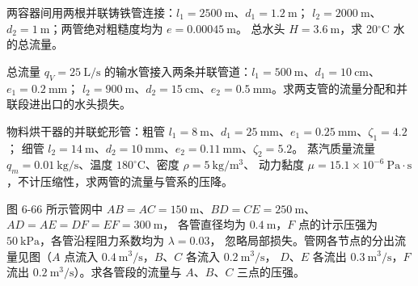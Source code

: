 \begin{ti}
\item[\textbf{6-27}] 两容器间用两根并联铸铁管连接：$l_1=2500\ \mathrm{m}$、$d_1=1.2\ \mathrm{m}$；
$l_2=2000\ \mathrm{m}$、$d_2=1\ \mathrm{m}$；两管绝对粗糙度均为 $e=0.00045\ \mathrm{m}$。
总水头 $H=3.6\ \mathrm{m}$，求 20$^\circ$C 水的总流量。
\quad{}\quad{}

\item[\textbf{6-28}] 总流量 $q_V=25\ \mathrm{L/s}$ 的输水管接入两条并联管道：$l_1=500\ \mathrm{m}$、$d_1=10\ \mathrm{cm}$、$e_1=0.2\ \mathrm{mm}$；
$l_2=900\ \mathrm{m}$、$d_2=15\ \mathrm{cm}$、$e_2=0.5\ \mathrm{mm}$。求两支管的流量分配和并联段进出口的水头损失。
\quad{}\quad{}

\item[\textbf{6-29}] 物料烘干器的并联蛇形管：粗管 $l_1=8\ \mathrm{m}$、$d_1=25\ \mathrm{mm}$、$e_1=0.25\ \mathrm{mm}$、$\zeta_1=4.2$；
细管 $l_2=14\ \mathrm{m}$、$d_2=10\ \mathrm{mm}$、$e_2=0.11\ \mathrm{mm}$、$\zeta_2=5.2$。
蒸汽质量流量 $q_m=0.01\ \mathrm{kg/s}$、温度 $180^\circ\mathrm{C}$、密度 $\rho=5\ \mathrm{kg/m^3}$、
动力黏度 $\mu=15.1\times10^{-6}\ \mathrm{Pa\cdot s}$，不计压缩性，求两管的流量与管系的压降。
\quad{}\quad{}

\item[\textbf{6-32}] 图 6-66 所示管网中 $AB=AC=150\ \mathrm{m}$、$BD=CE=250\ \mathrm{m}$、$AD=AE=DF=EF=300\ \mathrm{m}$，
各管直径均为 $0.4\ \mathrm{m}$，$F$ 点的计示压强为 $50\ \mathrm{kPa}$，各管沿程阻力系数均为 $\lambda=0.03$，
忽略局部损失。管网各节点的分出流量见图（$A$ 点流入 $0.4\ \mathrm{m^3/s}$，$B$、$C$ 各流入 $0.2\ \mathrm{m^3/s}$，
$D$、$E$ 各流出 $0.3\ \mathrm{m^3/s}$，$F$ 流出 $0.2\ \mathrm{m^3/s}$）。求各管段的流量与 $A$、$B$、$C$ 三点的压强。
\quad{}\quad{}


\end{ti}
